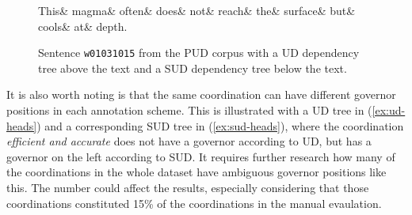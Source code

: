 \begin{figure}
\begin{exe}
	\ex\label{ex:rep-UD-magma}
	\begin{dependency}[hide label, baseline=-\the\dimexpr\fontdimen22\textfont2\relax]
		\begin{deptext}
			This\& magma\& often\& does\& not\& reach\& the\& surface\& but\& cools\& at\& depth.\\
		\end{deptext}
	
\end{dependency}
\end{exe}
\caption{Sentence \texttt{w01031015} from the PUD corpus \citep{pud} with a UD dependency tree above the text and a SUD dependency tree below the text.}
\end{figure}	

It is also worth noting is that the same coordination can have different governor positions in each annotation scheme. This is illustrated with a UD tree in (\ref{ex:ud-heads}) and a corresponding SUD tree in (\ref{ex:sud-heads}), where the coordination \textsl{efficient and accurate} does not have a governor according to UD, but has a governor on the left according to SUD. It requires further research how many of the coordinations in the whole dataset have ambiguous governor positions like this. The number could affect the results, especially considering that those coordinations constituted 15\% of the coordinations in the manual evaulation.

